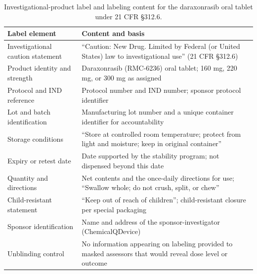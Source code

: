 \begin{table}[t]
\centering
\caption{Investigational-product label and labeling content for the daraxonrasib
oral tablet under 21 CFR \S 312.6.}
\label{tab:cmc-labeling}
\begin{tabularx}{\textwidth}{L{4.6cm} Y}
\toprule
\textbf{Label element} & \textbf{Content and basis} \\
\midrule
Investigational caution statement & ``Caution: New Drug. Limited by Federal (or United States) law to investigational use'' (21 CFR \S 312.6) \\
Product identity and strength & Daraxonrasib (RMC-6236) oral tablet; 160 mg, 220 mg, or 300 mg as assigned \\
Protocol and IND reference & Protocol number and IND number; sponsor protocol identifier \\
Lot and batch identification & Manufacturing lot number and a unique container identifier for accountability \\
Storage conditions & ``Store at controlled room temperature; protect from light and moisture; keep in original container'' \\
Expiry or retest date & Date supported by the stability program; not dispensed beyond this date \\
Quantity and directions & Net contents and the once-daily directions for use; ``Swallow whole; do not crush, split, or chew'' \\
Child-resistant statement & ``Keep out of reach of children''; child-resistant closure per special packaging \\
Sponsor identification & Name and address of the sponsor-investigator (ChemicalQDevice) \\
Unblinding control & No information appearing on labeling provided to masked assessors that would reveal dose level or outcome \\
\bottomrule
\end{tabularx}
\end{table}

